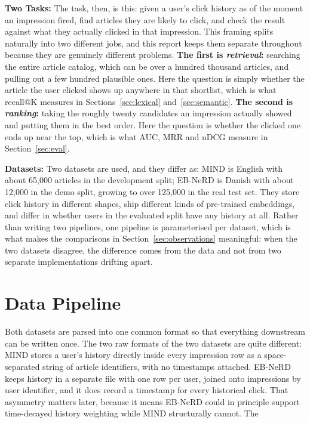 \documentclass[11pt]{article}
\begin{document}
\textbf{Two Tasks:} The task, then, is this: given a user's click history as of the moment an impression fired,
find articles they are likely to click, and check the result against what they actually
clicked in that impression. This framing splits naturally into two different jobs, and this
report keeps them separate throughout because they are genuinely different problems. \textbf{The first
is \emph{retrieval}:} searching the entire article catalog, which can be over a hundred
thousand articles, and pulling out a few hundred plausible ones. Here the question is simply
whether the article the user clicked shows up anywhere in that shortlist, which is what
recall@K measures in Sections~\ref{sec:lexical} and~\ref{sec:semantic}. \textbf{The second is
\emph{ranking}:} taking the roughly twenty candidates an impression actually showed and putting
them in the best order. Here the question is whether the clicked one ends up near the top,
which is what AUC, MRR and nDCG measure in Section~\ref{sec:eval}. 

\textbf{Datasets:} Two datasets are used, and they differ as: MIND is English with about 65,000 articles in the development split; EB-NeRD is
Danish with about 12,000 in the demo split, growing to over 125,000 in the real test set. They
store click history in different shapes, ship different kinds of pre-trained embeddings, and
differ in whether users in the evaluated split have any history at all. Rather than writing
two pipelines, one pipeline is parameterised per dataset, which is what makes the comparisons
in Section~\ref{sec:observations} meaningful: when the two datasets disagree, the difference
comes from the data and not from two separate implementations drifting apart.

\section{Data Pipeline}

Both datasets are parsed into one common format so that everything downstream can be written
once. 
The two raw formats of the two datasets are quite different: MIND stores a user's history directly inside every impression row as a space-separated string of article identifiers, with no timestamps
attached. EB-NeRD keeps history in a separate file with one row per user, joined onto
impressions by user identifier, and it does record a timestamp for every historical click.
That asymmetry matters later, because it means EB-NeRD could in principle support
time-decayed history weighting while MIND structurally cannot. The 
\end{document}
